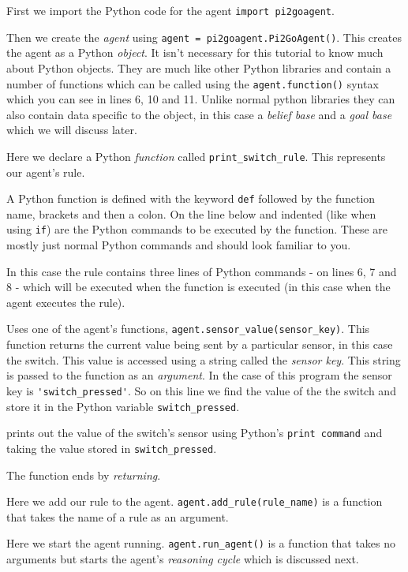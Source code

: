 \documentclass[a4,12pt]{article}
\begin{document}
\begin{description}
\item[Line 1]  First we import the Python code for the agent \lstinline{import pi2goagent}.
\item[Line 3] Then we create the \emph{agent} using \lstinline{agent = pi2goagent.Pi2GoAgent()}.  This creates the agent as a Python \emph{object}.  It isn't necessary for this tutorial to know much about Python objects.  They are much like other Python libraries and contain a number of functions which can be called using the \lstinline{agent.function()} syntax which you can see in lines 6, 10 and 11.  Unlike normal python libraries they can also contain data specific to the object, in this case a \emph{belief base} and a \emph{goal base} which we will discuss later.
\item[Line 5] Here we declare a Python \emph{function} called \lstinline{print_switch_rule}.  This represents our agent's rule.

  A Python function is defined with the keyword \lstinline{def} followed by the function name, brackets and then a colon.  On the line below and indented (like when using \lstinline{if}) are the Python commands to be executed by the function.  These are mostly just normal Python commands and should look familiar to you.

In this case the rule contains three lines of Python commands - on lines 6, 7 and 8 - which will be executed when the function is executed (in this case when the agent executes the rule).
\begin{sloppypar}
  \item[Line 6] Uses one of the agent's functions, \lstinline{agent.sensor_value(sensor_key)}.  This function returns the current value being sent by a particular sensor, in this case the switch.  This value is accessed using a string called the \emph{sensor key}.  This string is passed to the function as an \emph{argument}.  In the case of this program the sensor key is \lstinline{'switch_pressed'}.  So on this line we find the value of the the switch and store it in the Python variable \lstinline{switch_pressed}.
  \item[Line 7] prints out the value of the switch's sensor using Python's \lstinline{print command} and taking the value stored in \lstinline{switch_pressed}.
    \end{sloppypar}
\item [Line 8] The function ends by \emph{returning}.
\item[Line 10]  Here we add our rule to the agent.  \lstinline{agent.add_rule(rule_name)} is a function that takes the name of a rule as an argument.
\item[Line 11] Here we start the agent running.  \lstinline{agent.run_agent()} is a function that takes no arguments but starts the agent's \emph{reasoning cycle} which is discussed  next.
  \end{description}
\end{document}
